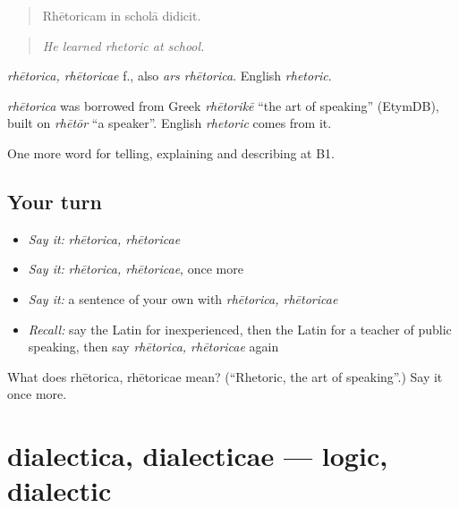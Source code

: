 \begin{quote}
Rhētoricam in scholā didicit.
\end{quote}

\begin{quote}
\emph{He learned rhetoric at school.}
\end{quote}

\emph{rhētorica, rhētoricae} f., also \emph{ars rhētorica}. English \emph{rhetoric}.

\begin{cousinweb}
\emph{rhētorica} was borrowed from Greek \emph{rhētorikē} \textquotedblleft{}the art of speaking\textquotedblright{} (EtymDB), built on \emph{rhētōr} \textquotedblleft{}a speaker\textquotedblright{}. English \emph{rhetoric} comes from it.
\end{cousinweb}

\begin{grammarlens}[title={What you've built}]
One more word for telling, explaining and describing at B1.
\end{grammarlens}

\subsection*{Your turn}
\begin{itemize}
\raggedright
  \item \emph{Say it:} \emph{rhētorica, rhētoricae}
  \item \emph{Say it:} \emph{rhētorica, rhētoricae}, once more
  \item \emph{Say it:} a sentence of your own with \emph{rhētorica, rhētoricae}
  \item \emph{Recall:} say the Latin for inexperienced, then the Latin for a teacher of public speaking, then say \emph{rhētorica, rhētoricae} again
\end{itemize}

\begin{tcolorbox}[breakable,colback=teal!4,colframe=teal!35!black,title={Before you move on}]
What does rhētorica, rhētoricae mean? (\textquotedblleft{}Rhetoric, the art of speaking\textquotedblright{}.) Say it once more.
\end{tcolorbox}
\section[dialectica, dialecticae]{dialectica, dialecticae — logic, dialectic}

\label{lesson:LA-C404-dialectica}



